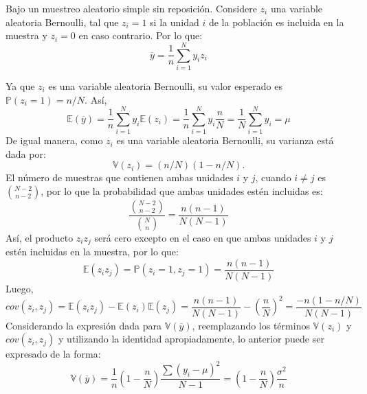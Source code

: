 
\addpoints
\question[15] Bajo un muestreo aleatorio simple sin reposición. Considere $z_i$ una variable aleatoria Bernoulli, tal que $z_i=1$ si la unidad $i$ de la población es incluida en la muestra y $z_i=0$ en caso contrario. Por lo que:
$$\overline{y}=\dfrac{1}{n}\sum_{i=1}^{N}y_i z_i$$

\noaddpoints
{}

\begin{solution}
 Ya que $z_i$ es una variable aleatoria Bernoulli, su valor esperado es $\mathbb{P}(z_i = 1)=n/N$. Así,
$$\mathbb{E}(\overline{y})=\dfrac{1}{n} \sum_{i=1}^{N} y_i\mathbb{E}(z_i)=\dfrac{1}{n}\sum_{i=1}^{N} y_i \dfrac{n}{N}= \dfrac{1}{N} \sum_{i=1}^{N} y_i = \mu$$
De igual manera, como $z_i$ es una variable aleatoria Bernoulli, su varianza está dada por: $$\mathbb{V}(z_i)=(n/N)(1-n/N).$$ El número de muestras que contienen ambas unidades $i$ y $j$, cuando $i\neq j$ es ${N-2}\choose{n-2}$, por lo que la probabilidad que ambas unidades estén incluidas es: 
$$\dfrac{{{N-2}\choose{n-2}}}{{{N}\choose{n}}}=\dfrac{n(n-1)}{N(N-1)}$$
Así, el producto $z_iz_j$ será cero excepto en el caso en que ambas unidades $i$ y $j$ estén incluidas en la muestra, por lo que:
$$\mathbb{E}(z_iz_j)=\mathbb{P}(z_i=1,z_j=1)=\dfrac{n(n-1)}{N(N-1)}$$
Luego, 
$$cov(z_i,z_j)=\mathbb{E}(z_iz_j)-\mathbb{E}(z_i)\mathbb{E}(z_j)=\dfrac{n(n-1)}{N(N-1)}- \left(\dfrac{n}{N} \right)^2=\dfrac{-n(1-n/N)}{N(N-1)}$$
Considerando la expresión dada para $\mathbb{V}(\overline{y})$, reemplazando los términos $\mathbb{V}(z_i)$ y $cov(z_i,z_j)$ y utilizando la identidad apropiadamente, lo anterior puede ser expresado de la forma:
$$\mathbb{V}(\overline{y})=\dfrac{1}{n}\left(1-\dfrac{n}{N}\right)\dfrac{\sum (y_i -\mu)^2}{N-1}=\left(1-\dfrac{n}{N}\right) \dfrac{\sigma^2}{n}$$
\end{solution}